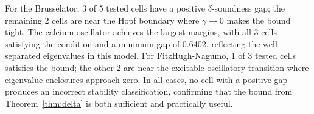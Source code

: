 \documentclass[11pt]{article}
\begin{document}
For the Brusselator, 3 of 5 tested cells have a positive $\delta$-soundness gap; the remaining 2 cells are near the Hopf boundary where $\gamma \to 0$ makes the bound tight.
The calcium oscillator achieves the largest margins, with all 3 cells satisfying the condition and a minimum gap of 0.6402, reflecting the well-separated eigenvalues in this model.
For FitzHugh-Nagumo, 1 of 3 tested cells satisfies the bound; the other 2 are near the excitable-oscillatory transition where eigenvalue enclosures approach zero.
In all cases, no cell with a positive gap produces an incorrect stability classification, confirming that the bound from Theorem~\ref{thm:delta} is both sufficient and practically useful.
\end{document}

